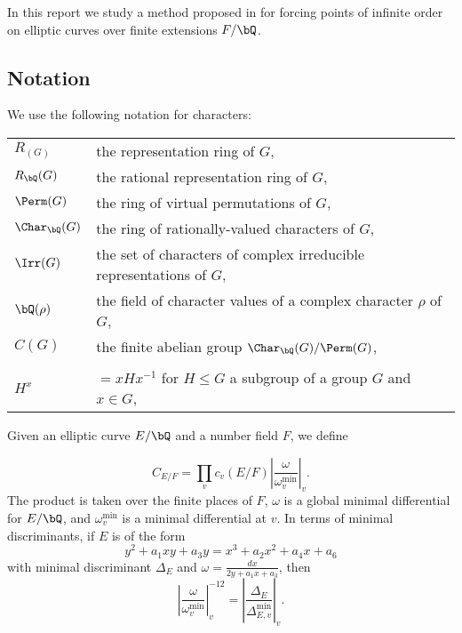 In this report we study a method proposed in \cite{DEW1} for forcing points of infinite order on elliptic curves over finite extensions $F / \bQ$. 

\subsection*{Notation}
We use the following notation for characters:

\bigskip

\begin{tabular}{l | l}
    $R_(G)$ & the representation ring of $G$, \\
    $R_{\bQ}(G)$ & the rational representation ring of $G$, \\
    $\Perm(G)$ & the ring of virtual permutations of $G$, \\
    $\Char_{\bQ}(G)$ & the ring of rationally-valued characters of $G$,\\
    $\Irr(G)$ & the set of characters of complex irreducible representations of $G$, \\
    $\bQ(\rho)$ & the field of character values of a complex character $\rho$ of $G$, \\
    $C(G)$ & the finite abelian group $\Char_{\bQ}(G) / \Perm(G)$, \\ 
    \\
    $H^{x}$ & $= xHx^{-1}$  for $H \leq G$ a subgroup of a group $G$ and $x \in G$,
\end{tabular}
\vspace{2em}

Given an elliptic curve $E / \bQ$ and a number field $F$, we define

\[ C_{E / F} = \prod_v c_v(E / F) \left| \frac{\omega}{\omega_v^{\min}} \right|_v. \]
The product is taken over the finite places of $F$, $\omega$ is a global minimal differential for $E / \bQ$, and $\omega_v^{\min}$ is a minimal differential at $v$. In terms of minimal discriminants, if $E$ is of the form
\[ y^2 + a_1 x y + a_3 y = x^3 + a_2 x^2 + a_4 x + a_6 \]
with minimal discriminant $\Delta_E$ and $\omega = \frac{dx}{2 y + a_1 x + a_3}$, then
\[ \left| \frac{\omega}{\omega_v^{\min}} \right|_v^{-12} = \left| \frac{\Delta_E}{\Delta_{E, v}^{\min}} \right|_v . \]